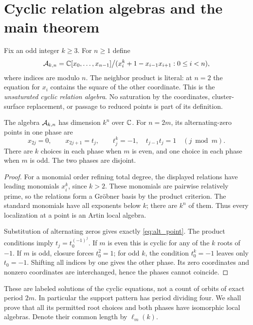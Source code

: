 \section{Cyclic relation algebras and the main theorem}\label{sec:main}

Fix an odd integer $k\geq3$. For $n\geq1$ define
\begin{equation}\label{eq:algebra}
 \mathcal A_{k,n}
 =\mathbb C[x_0,\ldots,x_{n-1}]
   \big/(x_i^k+1-x_{i-1}x_{i+1}:0\leq i<n),
\end{equation}
where indices are modulo $n$. The neighbor product is literal: at $n=2$
the equation for $x_i$ contains the square of the other coordinate.
This is the \emph{unsaturated cyclic relation algebra}. No saturation by
the coordinates, cluster-surface replacement, or passage to reduced
points is part of its definition.

\begin{lemma}\label{lem:finite_support}
The algebra $\mathcal A_{k,n}$ has dimension $k^n$ over $\mathbb C$.
For $n=2m$, its alternating-zero points in one phase are
\begin{equation}\label{eq:alt_point}
 x_{2j}=0,\qquad x_{2j+1}=t_j,\qquad
 t_j^k=-1,\quad t_{j-1}t_j=1 \quad(j\bmod m).
\end{equation}
There are $k$ choices in each phase when $m$ is even, and one choice
in each phase when $m$ is odd. The two phases are disjoint.
\end{lemma}

\begin{proof}
For a monomial order refining total degree, the displayed relations have
leading monomials $x_i^k$, since $k>2$. These monomials are pairwise
relatively prime, so the relations form a Gr\"obner basis by the product
criterion. The standard monomials have all exponents below $k$; there are
$k^n$ of them. Thus every localization at a point is an Artin local algebra.

Substitution of alternating zeros gives exactly
\eqref{eq:alt_point}. The product conditions imply
$t_j=t_0^{(-1)^j}$. If $m$ is even this is cyclic for any of the $k$
roots of $-1$. If $m$ is odd, closure forces $t_0^2=1$; for odd $k$,
the condition $t_0^k=-1$ leaves only $t_0=-1$.
Shifting all indices by one gives the other phase. Its zero coordinates
and nonzero coordinates are interchanged, hence the phases cannot coincide.
\end{proof}

These are labeled solutions of the cyclic equations, not a count of
orbits of exact period $2m$. In particular the support pattern has period
dividing four. We shall prove that all its permitted root choices and both
phases have isomorphic local algebras. Denote their common length by
$\ell_m(k)$.


